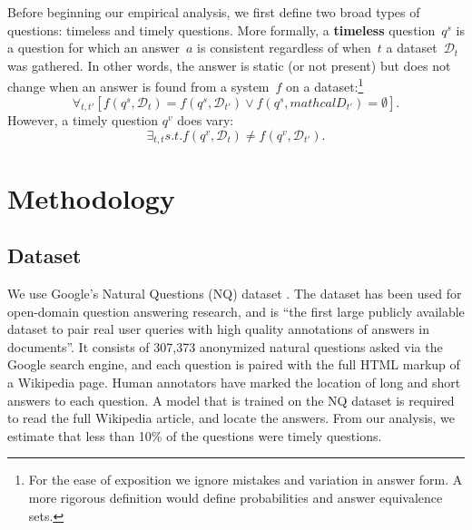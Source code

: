 \documentclass{article}
\begin{document}
Before beginning our empirical analysis, we first define two broad
types of questions: timeless and timely questions.
%
More formally, a {\bf timeless} question~$q^{s}$ is a question for
which an answer~$a$ is consistent regardless of when~$t$ a
dataset~$\mathcal{D}_t$ was gathered.
%
In other words, the answer is static (or not present) but does not
change when an answer is found from a  system~$f$ on a
dataset:\footnote{For the ease of exposition we ignore 
mistakes and variation in answer form.  A more rigorous definition
would define probabilities and answer equivalence sets.}
%
\begin{equation}
  \forall_{t,t'} \left[ f(q^{s}, \mathcal{D}_t) = f(q^{s},
    \mathcal{D}_{t'}) \vee f(q^{s}, mathcal{D}_{t'}) = \emptyset
    \right].
\end{equation}
%
However, a timely question $q^{v}$ does vary:
%
\begin{equation}
  \exists_{t,t} s.t. f(q^{v}, \mathcal{D}_t) \not = f(q^{v},
  \mathcal{D}_{t'}).
\end{equation}


\section{Methodology}
\label{methodology}


\subsection{Dataset}
\label{dataset}


We use Google’s Natural Questions (NQ) dataset \cite{nqdataset}. The
dataset has been used for open-domain question answering research, and
is “the first large publicly available dataset to pair real user
queries with high quality annotations of answers in documents”. It
consists of 307,373 anonymized natural questions asked via the Google
search engine, and each question is paired with the full HTML markup
of a Wikipedia page. Human annotators have marked the location of long
and short answers to each question. A model that is trained on the NQ
dataset is required to read the full Wikipedia article, and locate the
answers. From our analysis, we estimate that less than 10\% of the
questions were timely questions.
\end{document}
